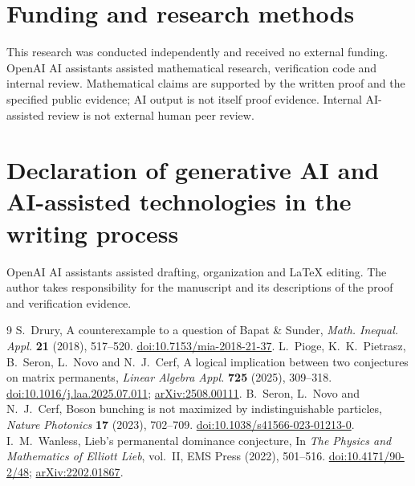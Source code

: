 \documentclass[11pt]{article}
\begin{document}
\section*{Funding and research methods}
This research was conducted independently and received no external
funding. OpenAI AI assistants assisted mathematical research, verification
code and internal review. Mathematical claims are supported by the
written proof and the specified public evidence; AI output is not itself
proof evidence. Internal AI-assisted review is not external human peer
review.
\section*{Declaration of generative AI and AI-assisted technologies
in the writing process}
OpenAI AI assistants assisted drafting, organization and LaTeX editing.
The author takes responsibility for the manuscript and its descriptions
of the proof and verification evidence.

\begin{thebibliography}{9}
 S.~Drury, A counterexample to a question of Bapat \& Sunder,
\emph{Math. Inequal. Appl.} \textbf{21} (2018), 517--520.
\href{https://doi.org/10.7153/mia-2018-21-37}{doi:10.7153/mia-2018-21-37}.
 L.~Pioge, K.~K.~Pietrasz, B.~Seron, L.~Novo and N.~J.~Cerf,
A logical implication between two conjectures on matrix permanents,
\emph{Linear Algebra Appl.} \textbf{725} (2025), 309--318.
\href{https://doi.org/10.1016/j.laa.2025.07.011}{doi:10.1016/j.laa.2025.07.011};
\href{https://arxiv.org/abs/2508.00111}{arXiv:2508.00111}.
 B.~Seron, L.~Novo and N.~J.~Cerf,
Boson bunching is not maximized by indistinguishable particles,
\emph{Nature Photonics} \textbf{17} (2023), 702--709.
\href{https://doi.org/10.1038/s41566-023-01213-0}{doi:10.1038/s41566-023-01213-0}.
 I.~M.~Wanless, Lieb's permanental dominance conjecture,
In \emph{The Physics and Mathematics of Elliott Lieb}, vol.~II,
EMS Press (2022), 501--516.
\href{https://doi.org/10.4171/90-2/48}{doi:10.4171/90-2/48};
\href{https://arxiv.org/abs/2202.01867}{arXiv:2202.01867}.
\end{thebibliography}
\end{document}
